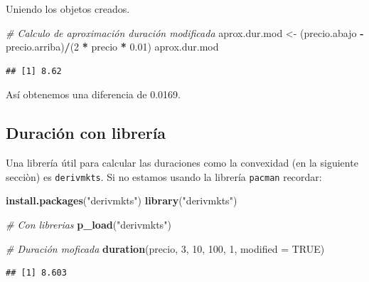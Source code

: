 \documentclass[12pt,]{book}
\newenvironment{Shaded}{\begin{snugshade}}{\end{snugshade}}
\newcommand{\KeywordTok}[1]{\textcolor[rgb]{0.13,0.29,0.53}{\textbf{#1}}}
\newcommand{\DataTypeTok}[1]{\textcolor[rgb]{0.13,0.29,0.53}{#1}}
\newcommand{\DecValTok}[1]{\textcolor[rgb]{0.00,0.00,0.81}{#1}}
\newcommand{\FloatTok}[1]{\textcolor[rgb]{0.00,0.00,0.81}{#1}}
\newcommand{\StringTok}[1]{\textcolor[rgb]{0.31,0.60,0.02}{#1}}
\newcommand{\CommentTok}[1]{\textcolor[rgb]{0.56,0.35,0.01}{\textit{#1}}}
\newcommand{\OtherTok}[1]{\textcolor[rgb]{0.56,0.35,0.01}{#1}}
\newcommand{\OperatorTok}[1]{\textcolor[rgb]{0.81,0.36,0.00}{\textbf{#1}}}
\newcommand{\NormalTok}[1]{#1}
\begin{document}
Uniendo los objetos creados.

\begin{Shaded}
\begin{Highlighting}[]
\CommentTok{# Calculo de aproximación duración modificada}
\NormalTok{aprox.dur.mod <-}\StringTok{ }\NormalTok{(precio.abajo }\OperatorTok{-}\StringTok{ }\NormalTok{precio.arriba)}\OperatorTok{/}\NormalTok{(}\DecValTok{2} \OperatorTok{*}\StringTok{ }\NormalTok{precio }\OperatorTok{*}\StringTok{ }\FloatTok{0.01}\NormalTok{)}
\NormalTok{aprox.dur.mod}
\end{Highlighting}
\end{Shaded}

\begin{verbatim}
## [1] 8.62
\end{verbatim}

Así obtenemos una diferencia de 0.0169.

\subsection{Duración con librería}\label{duracion-con-libreria}

Una librería útil para calcular las duraciones como la convexidad (en la
siguiente secciòn) es \texttt{derivmkts}. Si no estamos usando la
librería \texttt{pacman} recordar:

\begin{Shaded}
\begin{Highlighting}[]
\KeywordTok{install.packages}\NormalTok{(}\StringTok{"derivmkts"}\NormalTok{)}
\KeywordTok{library}\NormalTok{(}\StringTok{"derivmkts"}\NormalTok{)}
\end{Highlighting}
\end{Shaded}

\begin{Shaded}
\begin{Highlighting}[]
\CommentTok{# Con librerias}
\KeywordTok{p_load}\NormalTok{(}\StringTok{"derivmkts"}\NormalTok{)}

\CommentTok{# Duración moficada }
\KeywordTok{duration}\NormalTok{(precio, }\DecValTok{3}\NormalTok{, }\DecValTok{10}\NormalTok{, }\DecValTok{100}\NormalTok{, }\DecValTok{1}\NormalTok{, }\DataTypeTok{modified =} \OtherTok{TRUE}\NormalTok{)}
\end{Highlighting}
\end{Shaded}

\begin{verbatim}
## [1] 8.603
\end{verbatim}
\end{document}
